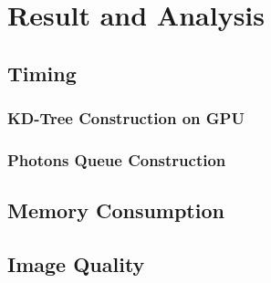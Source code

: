 \chapter{Result and Analysis}


\section{Timing}

\subsection{KD-Tree Construction on GPU} 

\subsection{Photons Queue Construction}

\section{Memory Consumption} 



\section{Image Quality}



